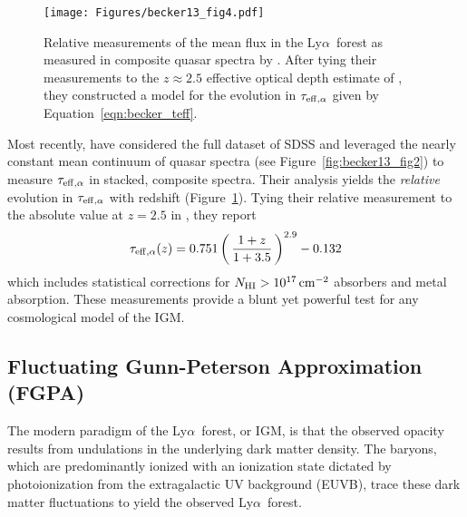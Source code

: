 \documentclass[graybox]{svmult}
\def\lya{Ly$\alpha$}
\def\ltp{\left ( \,}
\def\rtp{\, \right  ) }
\newcommand{\mnhi}{N_{\rm HI}}
\def\cm#1{\, {\rm cm^{#1}}}
\begin{document}
%
\begin{figure}[b]
\sidecaption
\texttt{[image: Figures/becker13\_fig4.pdf]}
%
%
\caption{Relative measurements of the mean flux in the 
\lya\ forest as measured in composite quasar spectra
by \cite{becker+13}.
After tying their measurements to the $z \approx 2.5$
effective optical depth estimate of \cite{fpl+08}, they constructed a model
for the evolution in $\tau_{\rm eff, \alpha}$ given
by Equation~\ref{eqn:becker_teff}.
}
\label{fig:rel_teff}       %
\end{figure}

Most recently, \cite{becker+13} have considered the full dataset
of SDSS and leveraged the nearly constant mean continuum of
quasar spectra (see Figure~\ref{fig:becker13_fig2}) to
measure $\tau_{\rm eff,\alpha}$ in stacked, composite spectra.
Their analysis yields the {\it relative} evolution in $\tau_{\rm eff,\alpha}$
with redshift (Figure~\ref{fig:rel_teff}).
Tying their relative measurement to the absolute value at
$z=2.5$ in \cite{fpl+08}, they report
\begin{equation}
\tau_{\rm eff, \alpha}(z) = 0.751 \ltp \frac{1+z}{1+3.5} 
\rtp^{2.9}  - 0.132
\label{eqn:becker_teff}
\end{equation}
which includes
statistical corrections for $\mnhi > 10^{17} \cm{-2}$ absorbers 
and metal absorption.
These measurements provide a blunt yet powerful test
for any cosmological model of the IGM.

\subsection{Fluctuating Gunn-Peterson Approximation (FGPA)}

The modern paradigm of the \lya\ forest, or IGM,
is that the observed opacity results from undulations
in the underlying dark matter density.  The baryons,
which are predominantly
ionized with an ionization state dictated by photoionization
from the extragalactic UV background (EUVB),
trace these dark matter fluctuations to yield the 
observed \lya\ forest.
\end{document}
